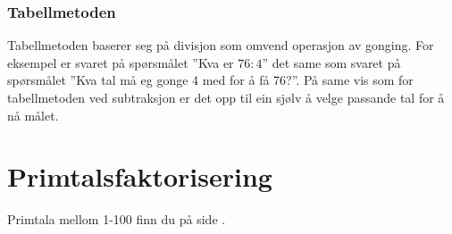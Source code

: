 \subsubsection{Tabellmetoden}
Tabellmetoden baserer seg på divisjon som omvend operasjon av gonging. For eksempel er svaret på spørsmålet ''Kva er $ {76:4} $'' det same som svaret på spørsmålet ''Kva tal må eg gonge 4 med for å få 76?''. På same vis som for tabellmetoden ved subtraksjon er det opp til ein sjølv å velge passande tal for å nå målet.
\begin{center}
	\parbox{0.35\linewidth}{
		} \qquad
\parbox{0.35\linewidth}{
	} \vsk

\parbox{0.415\linewidth}{
}
\end{center}

\section{Primtalsfaktorisering}
\mer Primtala mellom 1-100 finn du på side \pageref{primtalfig}.


